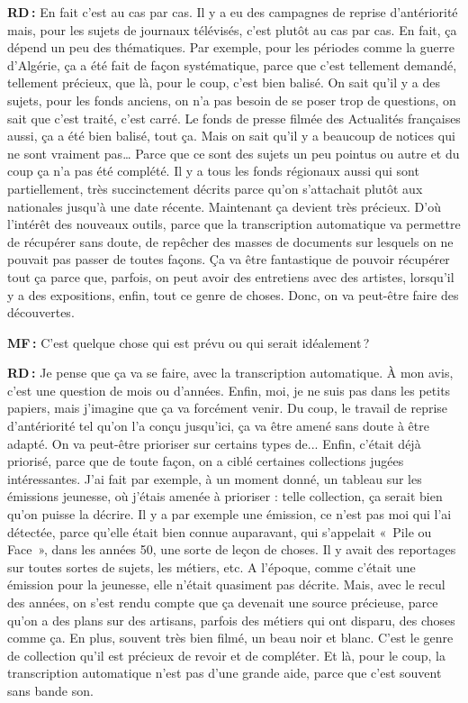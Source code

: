 \textbf{RD :} En fait c'est au cas par cas. Il y a eu des campagnes de reprise d'antériorité mais, pour les sujets de journaux télévisés, c'est plutôt au cas par cas. En fait, ça dépend un peu des thématiques. Par exemple, pour les périodes comme la guerre d'Algérie, ça a été fait de façon systématique, parce que c'est tellement demandé, tellement précieux, que là, pour le coup, c'est bien balisé. On sait qu'il y a des sujets, pour les fonds anciens, on n'a pas besoin de se poser trop de questions, on sait que c'est traité, c'est carré. Le fonds de presse filmée des Actualités françaises aussi, ça a été bien balisé, tout ça.  Mais on sait qu'il y a beaucoup de notices qui ne sont vraiment pas… Parce que ce sont des sujets un peu pointus ou autre et du coup ça n'a pas été complété.  Il y a tous les fonds régionaux aussi qui sont partiellement, très succinctement décrits parce qu'on s'attachait plutôt aux nationales jusqu'à une date récente. Maintenant ça devient très précieux. D'où l'intérêt des nouveaux outils, parce que la transcription automatique va permettre de récupérer sans doute, de repêcher des masses de documents sur lesquels on ne pouvait pas passer de toutes façons. Ça va être fantastique de pouvoir récupérer tout ça parce que, parfois, on peut avoir des entretiens avec des artistes, lorsqu’il y a des expositions, enfin, tout ce genre de choses.  Donc, on va peut-être faire des découvertes.

\textbf{MF :} C'est quelque chose qui est prévu ou qui serait idéalement ?   

\textbf{RD :} Je pense que ça va se faire, avec la transcription automatique. À mon avis, c'est une question de mois ou d'années. Enfin, moi, je ne suis pas dans les petits papiers, mais j'imagine que ça va forcément venir. Du coup, le travail de reprise d'antériorité tel qu'on l'a conçu jusqu'ici, ça va être amené sans doute à être adapté. On va peut-être prioriser sur certains types de...  Enfin, c'était déjà priorisé, parce que de toute façon, on a ciblé certaines collections jugées intéressantes. J'ai fait par exemple, à un moment donné, un tableau sur les émissions jeunesse, où j'étais amenée à prioriser : telle collection, ça serait bien qu'on puisse la décrire.  Il y a par exemple une émission, ce n'est pas moi qui l'ai détectée, parce qu'elle était bien connue auparavant, qui s'appelait « Pile ou Face », dans les années 50, une sorte de leçon de choses. Il y avait des reportages sur toutes sortes de sujets, les métiers, etc. A l'époque, comme c'était une émission pour la jeunesse, elle n'était quasiment pas décrite. Mais, avec le recul des années, on s'est rendu compte que ça devenait une source précieuse, parce qu'on a des plans sur des artisans, parfois des métiers qui ont disparu, des choses comme ça. En plus, souvent très bien filmé, un beau noir et blanc. C'est le genre de collection qu'il est précieux de revoir et de compléter. Et là, pour le coup, la transcription automatique n'est pas d'une grande aide, parce que c’est souvent sans bande son. 

